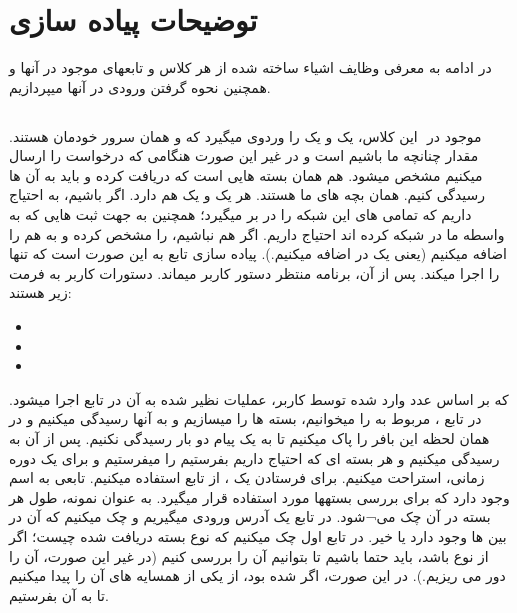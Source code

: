 \documentclass{article}
\begin{document}
    \section{توضیحات پیاده سازی}
در ادامه به معرفی وظایف اشیاء ساخته شده از هر کلاس و تابعهای موجود در آنها و همچنین نحوه گرفتن ورودی در آنها میپردازیم.
	\subsection{}
   موجود در ‌ این کلاس، یک  و یک  را وردوی میگیرد که  و  همان سرور خودمان هستند. مقدار  چنانچه ما  باشیم  است و در غیر این صورت هنگامی که درخواست  را ارسال میکنیم مشخص میشود.  هم همان بسته هایی است که دریافت کرده و باید به آن ها رسیدگی کنیم.  همان بچه های ما هستند. هر  یک  و یک  هم دارد. اگر  باشیم، به  احتیاج داریم که تمامی  های این شبکه را در بر میگیرد؛ همچنین به  جهت ثبت  هایی که به واسطه ما در شبکه  کرده اند احتیاج داریم. اگر هم ‌نباشیم،  را مشخص کرده و به  هم  را اضافه میکنیم (یعنی یک  در  اضافه میکنیم.).
پیاده سازی تابع  به این صورت است که تنها  را اجرا میکند. پس از آن، برنامه منتظر دستور کاربر میماند. دستورات کاربر به فرمت زیر هستند:
    \begin{itemize}
\item	{}
\item	{}
\item	 {}
    \end{itemize}
که بر اساس عدد وارد شده توسط کاربر، عملیات نظیر شده به آن در تابع  اجرا میشود.
در تابع ،  مربوط به  را میخوانیم، بسته ها را میسازیم و به آنها رسیدگی میکنیم و در همان لحظه این بافر را پاک میکنیم تا به یک پیام دو بار رسیدگی نکنیم. پس از آن به  رسیدگی میکنیم و هر بسته ای که احتیاج داریم بفرستیم را میفرستیم و برای یک دوره زمانی، استراحت  میکنیم. 
برای فرستادن یک ، از تابع  استفاده میکنیم.
تابعی به اسم  وجود دارد که برای بررسی بستهها مورد استفاده قرار میگیرد. به عنوان نمونه، طول هر بسته در آن چک می¬شود.
در تابع  یک آدرس ورودی میگیریم و چک میکنیم که آن  در بین  ها وجود دارد یا خیر.
در تابع  اول چک میکنیم که نوع بسته دریافت شده چیست؛ اگر از نوع  باشد، باید حتما  باشیم تا بتوانیم آن را بررسی کنیم (در غیر این صورت، آن را دور می ریزیم.). در این صورت، اگر  شده بود، از یکی از همسایه های آن را پیدا میکنیم تا به آن  بفرستیم.  
\end{document}
